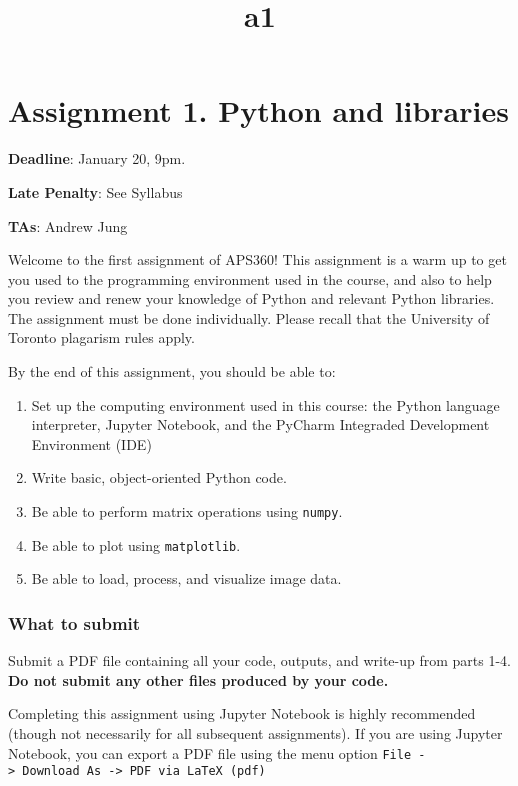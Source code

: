 \documentclass[11pt]{article}
\title{a1}
\providecommand{\tightlist}{%
      \setlength{\itemsep}{0pt}\setlength{\parskip}{0pt}}
\begin{document}
    
    
    \maketitle
    
    

    
    \section{Assignment 1. Python and
libraries}\label{assignment-1.-python-and-libraries}

\textbf{Deadline}: January 20, 9pm.

\textbf{Late Penalty}: See Syllabus

\textbf{TAs}: Andrew Jung

Welcome to the first assignment of APS360! This assignment is a warm up
to get you used to the programming environment used in the course, and
also to help you review and renew your knowledge of Python and relevant
Python libraries. The assignment must be done individually. Please
recall that the University of Toronto plagarism rules apply.

By the end of this assignment, you should be able to:

\begin{enumerate}
\def\labelenumi{\arabic{enumi}.}
\tightlist
\item
  Set up the computing environment used in this course: the Python
  language interpreter, Jupyter Notebook, and the PyCharm Integraded
  Development Environment (IDE)
\item
  Write basic, object-oriented Python code.
\item
  Be able to perform matrix operations using \texttt{numpy}.
\item
  Be able to plot using \texttt{matplotlib}.
\item
  Be able to load, process, and visualize image data.
\end{enumerate}

\subsubsection{What to submit}\label{what-to-submit}

Submit a PDF file containing all your code, outputs, and write-up from
parts 1-4. \textbf{Do not submit any other files produced by your code.}

Completing this assignment using Jupyter Notebook is highly recommended
(though not necessarily for all subsequent assignments). If you are
using Jupyter Notebook, you can export a PDF file using the menu option
\texttt{File\ -\textgreater{}\ Download\ As\ -\textgreater{}\ PDF\ via\ LaTeX\ (pdf)}
\end{document}
